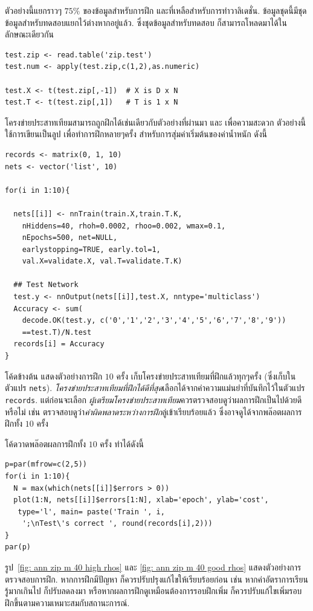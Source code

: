 ตัวอย่างนี้แยกราวๆ $75\%$ ของข้อมูลสำหรับการฝึก และที่เหลือสำหรับการทำวาลิเดชั่น.
ข้อมูลชุดนี้มีชุดข้อมูลสำหรับทดสอบแยกไว้ต่างหากอยู่แล้ว.
ซึ่งชุดข้อมูลสำหรับทดสอบ ก็สามารถโหลดมาได้ในลักษณะเดียวกัน
\begin{verbatim}
test.zip <- read.table('zip.test')
test.num <- apply(test.zip,c(1,2),as.numeric)

test.X <- t(test.zip[,-1])  # X is D x N
test.T <- t(test.zip[,1])   # T is 1 x N
\end{verbatim}

โครงข่ายประสาทเทียมสามารถถูกฝึกได้เช่นเดียวกับตัวอย่างที่ผ่านมา 
และ เพื่อความสะดวก ตัวอย่างนี้ใช้การเขียนเป็นลูป เพื่อทำการฝึกหลายๆครั้ง สำหรับการสุ่มค่าเริ่มต้นของค่าน้ำหนัก ดังนี้
\begin{verbatim}
records <- matrix(0, 1, 10)
nets <- vector('list', 10)

for(i in 1:10){

  nets[[i]] <- nnTrain(train.X,train.T.K, 
    nHiddens=40, rhoh=0.0002, rhoo=0.002, wmax=0.1, 
    nEpochs=500, net=NULL,
    earlystopping=TRUE, early.tol=1, 
    val.X=validate.X, val.T=validate.T.K)

  ## Test Network
  test.y <- nnOutput(nets[[i]],test.X, nntype='multiclass')
  Accuracy <- sum(
    decode.OK(test.y, c('0','1','2','3','4','5','6','7','8','9'))
    ==test.T)/N.test
  records[i] = Accuracy
}
\end{verbatim}

โค้ดข้างต้น แสดงตัวอย่างการฝึก $10$ ครั้ง 
เก็บโครงข่ายประสาทเทียมที่ฝึกแล้วทุกๆครั้ง (ซึ่งเก็บในตัวแปร \texttt{nets}).
\textit{โครงข่ายประสาทเทียมที่ฝึกได้ดีที่สุด}เลือกได้จากค่าความแม่นยำที่บันทึกไว้ในตัวแปร \texttt{records}.
แต่ก่อนจะเลือก \textit{ผู้เตรียมโครงข่ายประสาทเทียม}ควรตรวจสอบดูว่าผลการฝึกเป็นไปด้วยดีหรือไม่ 
เช่น ตรวจสอบดูว่า\textit{ค่าผิดพลาดระหว่างการฝึก}ลู่เข้าเรียบร้อยแล้ว ซึ่งอาจดูได้จากพล๊อตผลการฝึกทั้ง $10$ ครั้ง

โค้ดวาดพล๊อตผลการฝึกทั้ง $10$ ครั้ง ทำได้ดังนี้
\begin{verbatim}
p=par(mfrow=c(2,5))
for(i in 1:10){
  N = max(which(nets[[i]]$errors > 0))
  plot(1:N, nets[[i]]$errors[1:N], xlab='epoch', ylab='cost',
   type='l', main= paste('Train ', i, 
    ';\nTest\'s correct ', round(records[i],2)))
}
par(p)
\end{verbatim}

รูป~\ref{fig: ann zip m 40 high rhos} และ \ref{fig: ann zip m 40 good rhos} แสดงตัวอย่างการตรวจสอบการฝึก.
%
หากการฝึกมีปัญหา ก็ควรปรับปรุงแก้ไขให้เรียบร้อยก่อน เช่น หากค่าอัตราการเรียนรู้มากเกินไป ก็ปรับลดลงมา
หรือหากผลการฝึกดูเหมือนต้องการรอบฝึกเพิ่ม ก็ควรปรับแก้ไขเพิ่มรอบฝึกขึ้นตามความเหมาะสมกับสถานะการณ์.

